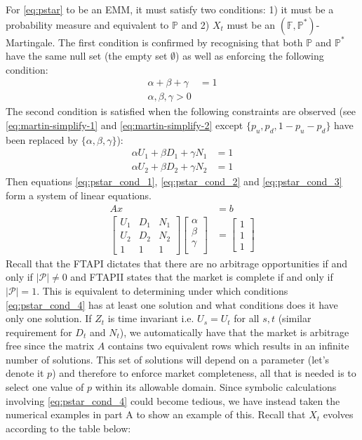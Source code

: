 \documentclass{article}
\begin{document}
For \ref{eq:pstar} to be an EMM, it must satisfy two conditions: 1) it must be a probability measure and equivalent to $\mathbb{P}$ and 2) $X_t$ must be an $(\mathbb{F},\mathbb{P}^*)$-Martingale. The first condition is confirmed by recognising that both $\mathbb{P}$ and $\mathbb{P}^*$ have the same null set (the empty set $\emptyset$) as well as enforcing the following condition:
\begin{align}
    \alpha + \beta + \gamma &= 1 \label{eq:pstar_cond_1} \\
    \alpha,\beta,\gamma>0 \nonumber
\end{align}
The second condition is satisfied when the following constraints are observed (see \ref{eq:martin-simplify-1} and \ref{eq:martin-simplify-2} except $\{p_u,p_d,1-p_u-p_d\}$ have been replaced by $\{\alpha,\beta,\gamma\}$): 
\begin{align}
    \alpha U_1 + \beta D_1 + \gamma N_1 &= 1 \label{eq:pstar_cond_2} \\
    \alpha U_2 + \beta D_2 + \gamma N_2 &= 1 \label{eq:pstar_cond_3}
\end{align}
Then equations \ref{eq:pstar_cond_1}, \ref{eq:pstar_cond_2} and \ref{eq:pstar_cond_3} form a system of linear equations. 
\begin{align}
    Ax &= b \nonumber\\ 
\left[\begin{array}{cccc} \label{eq:pstar_cond_4}
U_1 & D_1 & N_1\\
U_2 & D_2 & N_2\\
1 & 1 & 1 
\end{array} \right]
\left[\begin{array}{c}
\alpha\\
\beta\\
\gamma\\
\end{array} \right] &= \left[\begin{array}{c}
1\\
1\\
1
\end{array} \right]
\end{align}
Recall that the FTAPI dictates that there are no arbitrage opportunities if and only if $|\mathcal{P}|\neq0$ and FTAPII states that the market is complete if and only if $|\mathcal{P}|=1$. This is equivalent to determining under which conditions \ref{eq:pstar_cond_4} has at least one solution and what conditions does it have only one solution. If $Z_t$ is time invariant i.e. $U_s=U_t$ for all $s,t$ (similar requirement for $D_t$ and $N_t$), we automatically have that the market is arbitrage free since the matrix $A$ contains two equivalent rows which results in an infinite number of solutions. This set of solutions will depend on a parameter (let's denote it $p$) and therefore to enforce market completeness, all that is needed is to select one value of $p$ within its allowable domain. Since symbolic calculations involving \ref{eq:pstar_cond_4} could become tedious, we have instead taken the numerical examples in part A to show an example of this. Recall that $X_t$ evolves according to the table below:
\end{document}
